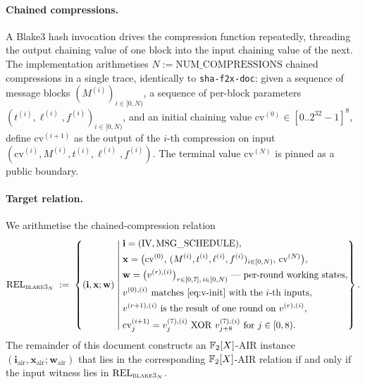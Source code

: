 \paragraph{Chained compressions.}
A Blake3 hash invocation drives the compression function repeatedly,
threading the output chaining value of one block into the input
chaining value of the next. The implementation arithmetises $N :=
\mathrm{NUM\_COMPRESSIONS}$ chained compressions in a single trace,
identically to \texttt{sha-f2x-doc}: given a sequence of message
blocks $(M^{(i)})_{i \in [0,N)}$, a sequence of per-block parameters
$(t^{(i)}, \ell^{(i)}, f^{(i)})_{i \in [0,N)}$, and an initial
chaining value $\mathrm{cv}^{(0)} \in [0\mathbin{..}2^{32}-1]^8$, define
$\mathrm{cv}^{(i+1)}$ as the output of the $i$-th compression on input
$(\mathrm{cv}^{(i)}, M^{(i)}, t^{(i)}, \ell^{(i)}, f^{(i)})$. The
terminal value $\mathrm{cv}^{(N)}$ is pinned as a public boundary.

\paragraph{Target relation.}
We arithmetise the chained-compression relation
\begin{equation}\label{eq:rel-b3}
\mathrm{REL}_{\textsc{blake3}_N} \;:=\;
\left\{(\mathbf{i},\mathbf{x};\mathbf{w}) \;\middle|\;
\begin{aligned}
&\mathbf{i} = (\mathrm{IV}, \mathrm{MSG\_SCHEDULE}), \\
&\mathbf{x} = \bigl(\mathrm{cv}^{(0)},\,
                    (M^{(i)}, t^{(i)}, \ell^{(i)}, f^{(i)})_{i \in [0,N)},\,
                    \mathrm{cv}^{(N)}\bigr), \\
&\mathbf{w} = \bigl(v^{(r),(i)}\bigr)_{r \in [0,7],\, i \in [0,N)}
              \text{ — per-round working states}, \\
&v^{(0),(i)} \text{ matches \eqref{eq:v-init} with the $i$-th inputs}, \\
&v^{(r+1),(i)} \text{ is the result of one round on } v^{(r),(i)}, \\
&\mathrm{cv}^{(i+1)}_j = v^{(7),(i)}_j \,\operatorname{XOR}\, v^{(7),(i)}_{j+8}
   \text{ for } j \in [0,8).
\end{aligned}\right\}.
\end{equation}
The remainder of this document constructs an $\mathbb{F}_2[X]$-AIR instance
$(\mathbf{i}_{\text{air}},\mathbf{x}_{\text{air}};\mathbf{w}_{\text{air}})$
that lies in the corresponding $\mathbb{F}_2[X]$-AIR relation if and only if
the input witness lies in $\mathrm{REL}_{\textsc{blake3}_N}$.

